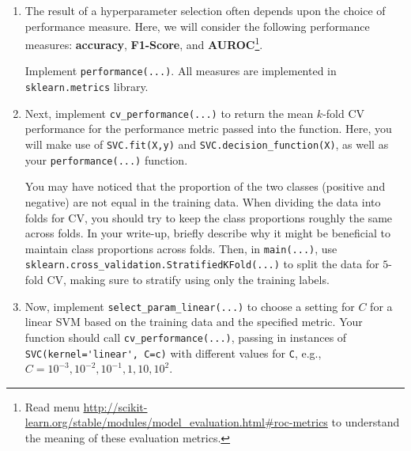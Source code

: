 \documentclass[11pt]{article}
\begin{document}
\begin{enumerate}

\item {} The result of a hyperparameter selection often depends upon the choice of performance measure. Here, we will consider the following performance measures: \textbf{accuracy}, \textbf{F1-Score}, and \textbf{AUROC}\footnote{Read menu \url{http://scikit-learn.org/stable/modules/model_evaluation.html#roc-metrics} to understand the meaning of these evaluation metrics.}.

Implement \verb|performance(...)|. All measures are implemented in \verb|sklearn.metrics| library.


\item {} Next, implement \verb|cv_performance(...)| to return the mean $k$-fold CV performance for the performance metric passed into the function. Here, you will make use of \verb|SVC.fit(X,y)| and \verb|SVC.decision_function(X)|, as well as your \verb|performance(...)| function.

You may have noticed that the proportion of the two classes (positive and negative) are not equal in the training data. When dividing the data into folds for CV, you should try to keep the class proportions roughly the same across folds. In your write-up, briefly describe why it might be beneficial to maintain class proportions across folds. Then, in \verb|main(...)|, use \verb|sklearn.cross_validation.StratifiedKFold(...)| to split the data for $5$-fold CV, making sure to stratify using only the training labels.

\solution{
}

\item {} Now, implement \verb|select_param_linear(...)| to choose a setting for $C$ for a linear SVM based on the training data and the specified metric. Your function should call \verb|cv_performance(...)|, passing in instances of \verb|SVC(kernel='linear', C=c)| with different values for \verb|C|, e.g., $C = 10^{-3}, 10^{-2}, 10^{-1}, 1, 10, 10^{2}$.


\end{enumerate}
\end{document}

